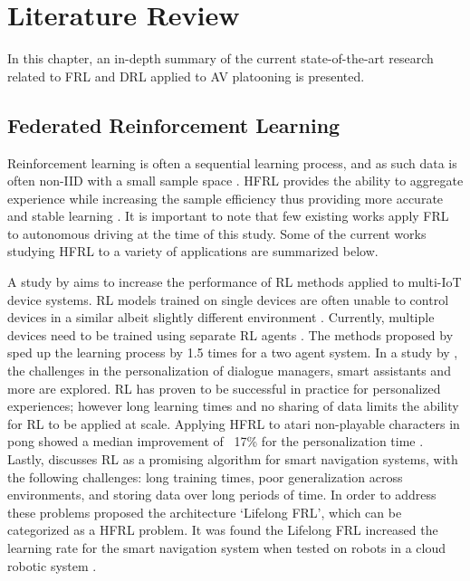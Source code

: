 \chapter{Literature Review} \label{chap:litreview}
In this chapter, an in-depth summary of the current state-of-the-art research related to FRL and DRL applied to AV platooning is presented. 

\section{Federated Reinforcement Learning}

Reinforcement learning is often a sequential learning process, and as such data is often non-IID with a small sample space \cite{sutton2018reinforcement}.  HFRL provides the ability to aggregate experience while increasing the sample efficiency thus providing more accurate and stable learning  \cite{IntelAI19}. It is important to note that few existing works apply FRL to autonomous driving at the time of this study.  Some of the current works studying HFRL to a variety of applications are summarized below.

A study by \cite{Lim2020} aims to increase the performance of RL methods applied to multi-IoT device systems.  RL models trained on single devices are often unable to control devices in a similar albeit slightly different environment \cite{Lim2020}.  Currently, multiple devices need to be trained using separate RL agents \cite{Lim2020}. The methods proposed by \cite{Lim2020} sped up the learning process by 1.5 times for a two agent system. In a study by \cite{Nadiger2019}, the challenges in the personalization of dialogue managers, smart assistants and more are explored.  RL has proven to be successful in practice for personalized experiences; however long learning times and no sharing of data limits the ability for RL to be applied at scale.  Applying HFRL to atari non-playable characters in pong showed a median improvement of ~17\% for the personalization time \cite{Nadiger2019}. Lastly, \cite{Liu2019b} discusses RL as a promising algorithm for smart navigation systems, with the following challenges: long training times, poor generalization across environments, and storing data over long periods of time.  In order to address these problems \cite{Liu2019b} proposed the architecture `Lifelong FRL', which can be categorized as a HFRL problem.  It was found the Lifelong FRL increased the learning rate for the smart navigation system when tested on robots in a cloud robotic system \cite{Liu2019b}.  

